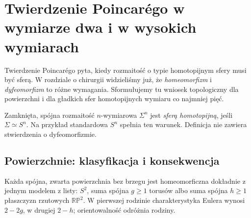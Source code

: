 \chapter{Twierdzenie Poincarégo w wymiarze dwa i w wysokich wymiarach}
\label{ch:poincare-2-high}

Twierdzenie Poincarégo pyta, kiedy rozmaitość
o typie homotopijnym sfery musi być sferą.
W rozdziale o chirurgii widzieliśmy już,
że \emph{homeomorfizm} i \emph{dyfeomorfizm}
to różne wymagania. Sformułujemy tu
wniosek topologiczny dla powierzchni
i dla gładkich sfer homotopijnych
wymiaru co najmniej pięć.

\begin{definicja}
\label{def:homotopy-sphere-24}
Zamknięta, spójna rozmaitość $n$-wymiarowa
$\Sigma^n$ jest \emph{sferą homotopijną},
jeśli $\Sigma\simeq S^n$.
Na przykład standardowa $S^n$ spełnia
ten warunek. Definicja nie zawiera
stwierdzenia o dyfeomorfizmie.
\end{definicja}

\section{Powierzchnie: klasyfikacja i konsekwencja}
\label{sec:poincare-2}

\begin{twierdzenie}
\label{thm:classification-surfaces-24}
Każda spójna, zwarta powierzchnia
bez brzegu jest homeomorficzna
dokładnie z jednym modelem z listy:
$S^2$, suma spójna $g\geq1$ torusów
albo suma spójna $h\geq1$ płaszczyzn
rzutowych $\mathbb{RP}^2$.
W pierwszej rodzinie charakterystyka
Eulera wynosi $2-2g$, w drugiej $2-h$;
orientowalność odróżnia rodziny.
\end{twierdzenie}

